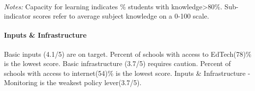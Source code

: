 \documentclass[
  twocolumn]{article}
\begin{document}
\begin{table}[H]
\\
\color{darkgray}\scriptsize{\textit{Notes:} Capacity for learning indicates \% students with knowledge\textgreater{80\%}. Sub-indicator scores refer to average subject knowledge on a 0-100 scale.}
\end{table}
\vfill\null

\hypertarget{inputs-infrastructure}{%
\paragraph{\texorpdfstring{\textbf{Inputs \&
Infrastructure}}{Inputs \& Infrastructure}}\label{inputs-infrastructure}}

Basic inputs (4.1/5) are on target. Percent of schools with access to
EdTech(78)\% is the lowest score. Basic infrastructure (3.7/5) requires
caution. Percent of schools with access to internet(54)\% is the lowest
score. Inputs \& Infrastructure - Monitoring is the weakest policy
lever(3.7/5).
\end{document}
